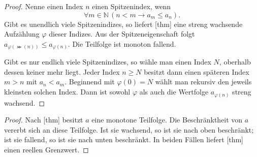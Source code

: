 \documentclass[main.tex]{subfiles}
\begin{document}
\begin{proof}
Nenne einen Index \(n\) einen Spitzenindex, wenn
\[
  \forall m\in\mathbb N\,(n<m\rightarrow a_m\leq a_n).
\]
Gibt es unendlich viele Spitzenindizes, so liefert
[thm] eine streng
wachsende Aufzählung \(\varphi\) dieser Indizes. Aus der Spitzeneigenschaft
folgt
\(a_{\varphi(\Succ(n))}\leq a_{\varphi(n)}\). Die Teilfolge ist monoton
fallend.

Gibt es nur endlich viele Spitzenindizes, so wähle man einen Index
\(N\), oberhalb dessen keiner mehr liegt. Jeder Index \(n\geq N\) besitzt
dann einen späteren Index \(m>n\) mit \(a_n<a_m\). Beginnend mit
\(\varphi(0)=N\) wählt man rekursiv den jeweils kleinsten solchen Index.
Dann ist sowohl \(\varphi\) als auch die Wertfolge
\(a_{\varphi(n)}\) streng wachsend.
\end{proof}

\begin{proof}
Nach [thm] besitzt \(a\) eine
monotone Teilfolge. Die Beschränktheit von \(a\) vererbt sich an diese
Teilfolge. Ist sie wachsend, so ist sie nach oben beschränkt; ist sie
fallend, so ist sie nach unten beschränkt. In beiden Fällen liefert
[thm] einen reellen Grenzwert.
\end{proof}
\end{document}
